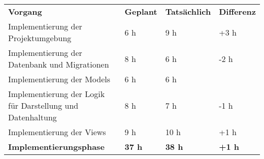 \begin{tabular}{llll}
\rowcolor{heading}\textbf{Vorgang} & \textbf{Geplant} & \textbf{Tatsächlich} & \textbf{Differenz} \\
Implementierung der Projektumgebung & 6 h & 9 h & +3 h \\
\rowcolor{odd}Implementierung der Datenbank und Migrationen & 8 h & 6 h & -2 h \\
Implementierung der Models & 6 h & 6 h &  \\
\rowcolor{odd}Implementierung der Logik für Darstellung und Datenhaltung & 8 h & 7 h & -1 h \\
Implementierung der Views & 9 h & 10 h & +1 h \\
\hline
\hline
\rowcolor{heading}\textbf{Implementierungsphase} & \textbf{37 h} & \textbf{38 h} & \textbf{+1 h} \\
\end{tabular}
